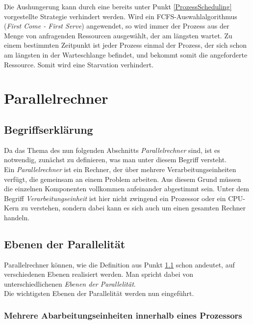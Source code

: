 				Die Aushungerung kann durch eine bereits unter Punkt \ref{ProzessScheduling} vorgestellte Strategie verhindert werden. Wird ein FCFS-Auswahlalgorithmus (\textit{First Come - First Serve}) angewendet, so wird immer der Prozess aus der Menge von anfragenden Ressourcen ausgewählt, der am längsten wartet. Zu einem bestimmten Zeitpunkt ist jeder Prozess einmal der Prozess, der sich schon am längsten in der Warteschlange befindet, und bekommt somit die angeforderte Ressource. Somit wird eine Starvation verhindert.
				
	\section{Parallelrechner}
		
		\subsection{Begriffserklärung}
			\label{ParallelrechnerBegriffserklaerung}
			
			Da das Thema des nun folgenden Abschnitts \textit{Parallelrechner} sind, ist es notwendig, zunächst zu definieren, was man unter diesem Begriff versteht.\\
			Ein \textit{Parallelrechner} ist ein Rechner, der über mehrere Verarbeitungseinheiten verfügt, die gemeinsam an einem Problem arbeiten. Aus diesem Grund müssen die einzelnen Komponenten vollkommen aufeinander abgestimmt sein. Unter dem Begriff \textit{Verarbeitungseinheit} ist hier nicht zwingend ein Prozessor oder ein CPU-Kern zu verstehen, sondern dabei kann es sich auch um einen gesamten Rechner handeln. \cite{ParallelrechnerAmirnaderi}
			
		\subsection{Ebenen der Parallelität}
			\label{EbenenParallelitaet}
		
			Parallelrechner können, wie die Definition aus Punkt \ref{ParallelrechnerBegriffserklaerung} schon andeutet, auf verschiedenen Ebenen realisiert werden. Man spricht dabei von unterschiedlichenen \textit{Ebenen der Parallelität}.\\
			Die wichtigsten Ebenen der Parallelität werden nun eingeführt. \cite{GrundlagenParallelisierungKegel}
			
			\subsubsection{Mehrere Abarbeitungseinheiten innerhalb eines Prozessors}
				\label{MehrereAbarbeitungseinheitenProzessor}
				
